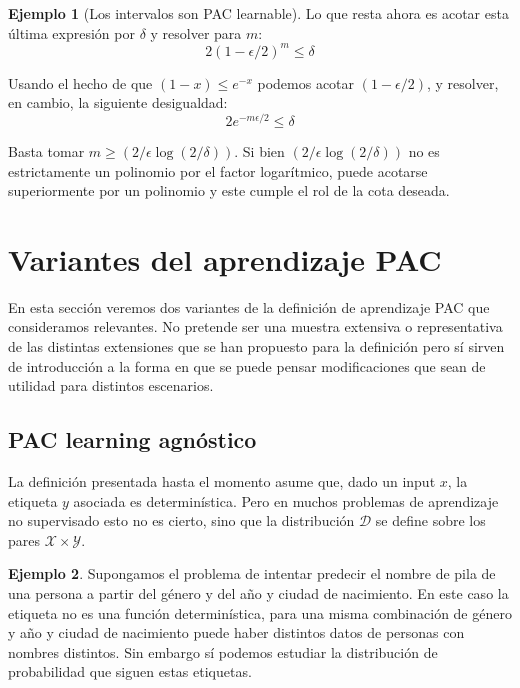\documentclass{article}
\theoremstyle{definition}
\newtheorem{example}{Ejemplo}%
\begin{document}
\begin{example}[Los intervalos son PAC learnable]
Lo que resta ahora es acotar esta \'ultima expresi\'on por $\delta$ y resolver para $m$:
$$
2 (1-\epsilon/2)^m \leq \delta
$$

Usando el hecho de que $(1-x) \leq e^{-x}$ podemos acotar $(1-\epsilon/2)$, y resolver, en cambio, la siguiente desigualdad:
$$
2 e^{-m\epsilon/2} \leq \delta
$$

Basta tomar $m \geq (2/\epsilon \log(2/\delta))$. Si bien $(2/\epsilon \log(2/\delta))$ no es estrictamente un polinomio por el factor logar\'itmico, puede acotarse superiormente por un polinomio y este cumple el rol de la cota deseada.

\end{example}


\section{Variantes del aprendizaje PAC}

En esta secci\'on veremos dos variantes de la definici\'on de aprendizaje PAC que consideramos relevantes. No pretende ser una muestra extensiva o representativa de las distintas extensiones que se han propuesto para la definici\'on pero s\'i sirven de introducci\'on a la forma en que se puede pensar modificaciones que sean de utilidad para distintos escenarios.

\label{sec:var}

\subsection{PAC learning agn\'ostico}
La definici\'on presentada hasta el momento asume que, dado un input $x$, la etiqueta $y$ asociada es determin\'istica. Pero en muchos problemas de aprendizaje no supervisado esto no es cierto, sino que la distribuci\'on $\mathcal{D}$ se define sobre los pares $\mathcal{X} \times \mathcal{Y}$. 

\begin{example} Supongamos el problema de intentar predecir el nombre de pila de una persona a partir del g\'enero y del a\~no y ciudad de nacimiento. En este caso la etiqueta no es una funci\'on determin\'istica, para una misma combinaci\'on de g\'enero y a\~no y ciudad de nacimiento puede haber distintos datos de personas con nombres distintos. Sin embargo s\'i podemos estudiar la distribuci\'on de probabilidad que siguen estas etiquetas.
    
\end{example}
\end{document}
